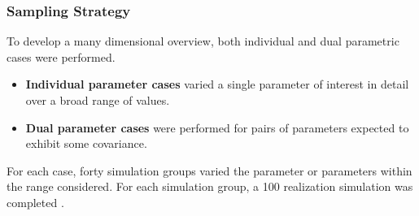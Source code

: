 \begin{frame}[c]
  \frametitle{Sampling Strategy}
  \footnotesize{
To develop a many dimensional overview, both individual and dual parametric cases were performed.

\begin{itemize}
  \item \textbf{Individual parameter cases} varied a single parameter of interest in 
detail over a broad range of values. 
  \item \textbf{Dual parameter cases} were performed for pairs of parameters expected to exhibit some covariance. 
\end{itemize}    
For each case, forty simulation 
groups varied the parameter or parameters within the range considered. 
For each simulation group, a 100 realization simulation was completed 
\cite{clayton_generic_2011, 
nutt_generic_2009}.  


}

\end{frame}
